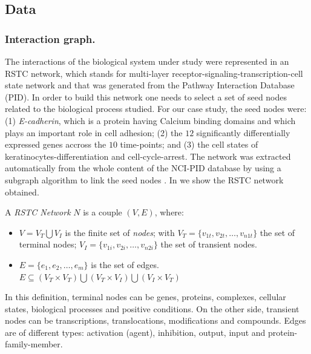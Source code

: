 \subsection{Data}

\subsubsection{Interaction graph.}
\label{ssec:RSTC}
The interactions of the biological system under study were represented in
 an RSTC network, which stands for  multi-layer receptor-signaling-transcription-cell state network and that was generated from the Pathway Interaction Database (PID).
In order to build this network one needs to select a set of seed nodes related to the biological process studied.
For our case study, the seed nodes were:  (1) \emph{E-cadherin}, which is a protein having Calcium binding domains and which plays an important role in cell adhesion;
(2) the $12$ significantly differentially expressed genes accross the $10$ time-points; and (3) the cell states of keratinocytes-differentiation and cell-cycle-arrest. 
The network was extracted automatically from the whole content of the NCI-PID database by using a subgraph algorithm to link the seed nodes \cite{guziolowski2012automatic}. 
In  we show the RSTC network obtained. 

\begin{definition} \label{def:RSTCDef}
A \emph{RSTC Network} $N$ is a couple $(V,E)$, where:
\begin{itemize}
\item $V =V_{T} \bigcup V_{I} $ is the finite set of \emph{nodes};
 with 
  $V_{T} = \{v_{1t},v_{2t}, \dots ,v_{n1t} \} $ the set of terminal nodes;
  $V_{I} = \{v_{1i},v_{2i}, \dots ,v_{n2i} \} $ the set of transient nodes.
\item $E = \{e_{1},e_{2}, \dots, e_{m} \}$ is the set of edges. $ E \subseteq (V_{T} \times V_{T}) \bigcup (V_{T} \times V_{I}) 
\bigcup (V_{I} \times V_{T})$
\end{itemize}
\end{definition}

In this definition, terminal nodes can be genes, proteins, complexes, cellular states, biological processes and positive conditions. 
On the other side, transient nodes can be transcriptions, translocations, modifications and compounds. Edges are of different types:
activation (agent), inhibition, output, input and protein-family-member.


